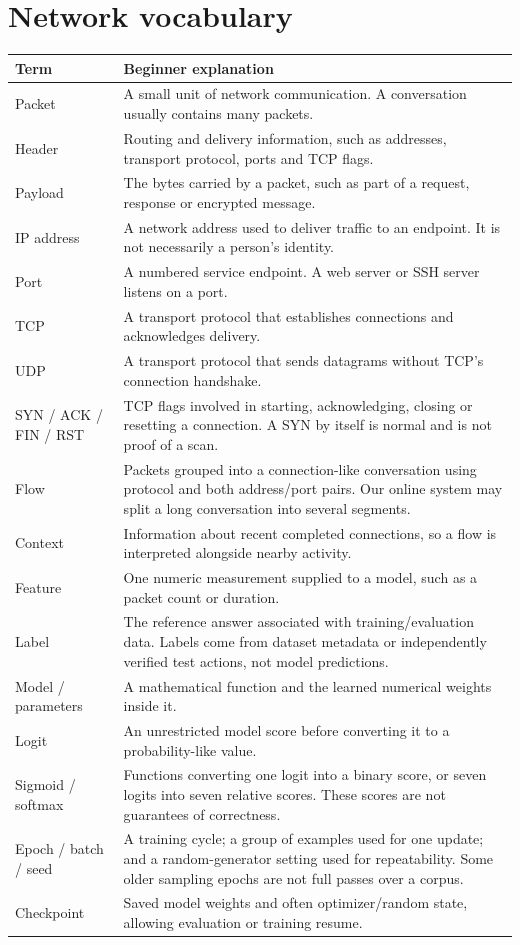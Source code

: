 \documentclass[11pt,a4paper,oneside]{report}
\begin{document}
\section{Network vocabulary}
\begin{longtable}{p{}p{}}
\toprule Term & Beginner explanation\\\midrule\endhead
Packet & A small unit of network communication. A conversation usually contains many packets.\\
Header & Routing and delivery information, such as addresses, transport protocol, ports and TCP flags.\\
Payload & The bytes carried by a packet, such as part of a request, response or encrypted message.\\
IP address & A network address used to deliver traffic to an endpoint. It is not necessarily a person's identity.\\
Port & A numbered service endpoint. A web server or SSH server listens on a port.\\
TCP & A transport protocol that establishes connections and acknowledges delivery.\\
UDP & A transport protocol that sends datagrams without TCP's connection handshake.\\
SYN / ACK / FIN / RST & TCP flags involved in starting, acknowledging, closing or resetting a connection. A SYN by itself is normal and is not proof of a scan.\\
Flow & Packets grouped into a connection-like conversation using protocol and both address/port pairs. Our online system may split a long conversation into several segments.\\
Context & Information about recent completed connections, so a flow is interpreted alongside nearby activity.\\
Feature & One numeric measurement supplied to a model, such as a packet count or duration.\\
Label & The reference answer associated with training/evaluation data. Labels come from dataset metadata or independently verified test actions, not model predictions.\\
Model / parameters & A mathematical function and the learned numerical weights inside it.\\
Logit & An unrestricted model score before converting it to a probability-like value.\\
Sigmoid / softmax & Functions converting one logit into a binary score, or seven logits into seven relative scores. These scores are not guarantees of correctness.\\
Epoch / batch / seed & A training cycle; a group of examples used for one update; and a random-generator setting used for repeatability. Some older sampling epochs are not full passes over a corpus.\\
Checkpoint & Saved model weights and often optimizer/random state, allowing evaluation or training resume.\\
\bottomrule
\end{longtable}
\end{document}
